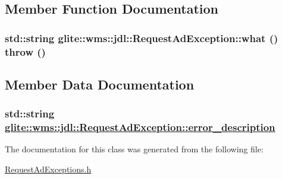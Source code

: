 \subsection{Member Function Documentation}
\hypertarget{classglite_1_1wms_1_1jdl_1_1RequestAdException_a0}{
\subsubsection[what]{\setlength{\rightskip}{0pt plus 5cm}std::string glite::wms::jdl::Request\-Ad\-Exception::what ()  throw ()}}
\label{classglite_1_1wms_1_1jdl_1_1RequestAdException_a0}




\subsection{Member Data Documentation}
\hypertarget{classglite_1_1wms_1_1jdl_1_1RequestAdException_p0}{
\subsubsection[error\_\-description]{\setlength{\rightskip}{0pt plus 5cm}std::string \hyperlink{classglite_1_1wms_1_1jdl_1_1RequestAdException_p0}{glite::wms::jdl::Request\-Ad\-Exception::error\_\-description}}}
\label{classglite_1_1wms_1_1jdl_1_1RequestAdException_p0}




The documentation for this class was generated from the following file:\begin{CompactItemize}
\item 
\hyperlink{RequestAdExceptions_8h}{Request\-Ad\-Exceptions.h}\end{CompactItemize}
